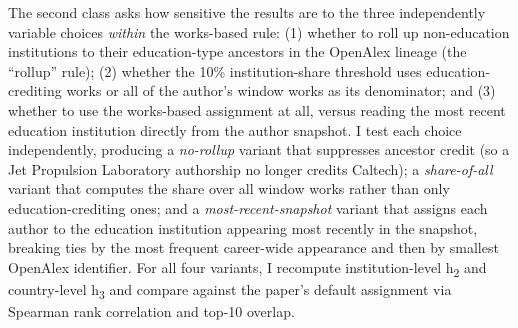 The second class asks how sensitive the results are to the three independently variable choices \textit{within} the works-based rule: (1) whether to roll up non-education institutions to their education-type ancestors in the OpenAlex lineage (the ``rollup'' rule); (2) whether the 10\% institution-share threshold uses education-crediting works or all of the author's window works as its denominator; and (3) whether to use the works-based assignment at all, versus reading the most recent education institution directly from the author snapshot. I test each choice independently, producing a \textit{no-rollup} variant that suppresses ancestor credit (so a Jet Propulsion Laboratory authorship no longer credits Caltech); a \textit{share-of-all} variant that computes the share over all window works rather than only education-crediting ones; and a \textit{most-recent-snapshot} variant that assigns each author to the education institution appearing most recently in the snapshot, breaking ties by the most frequent career-wide appearance and then by smallest OpenAlex identifier. For all four variants, I recompute institution-level h\textsubscript{2} and country-level h\textsubscript{3} and compare against the paper's default assignment via Spearman rank correlation and top-10 overlap.


